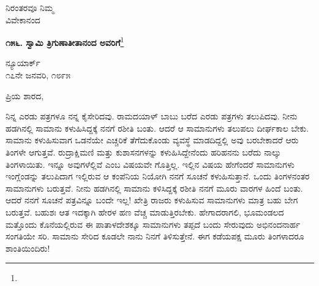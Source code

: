 {\flushright
ನಿರಂತರವೂ ನಿಮ್ಮ\\ವಿವೇಕಾನಂದ\par}

\begin{center}
\textbf{೧೫೬. ಸ್ವಾಮಿ ತ್ರಿಗುಣಾತೀತಾನಂದ ಅವರಿಗೆ}\footnote{}
\end{center}

\begin{flushright}
ನ್ಯೂಯಾರ್ಕ್\\೧೭ನೇ ಜನವರಿ, ೧೮೯೫
\end{flushright}

\noindent
ಪ್ರಿಯ ಶಾರದ,

ನಿನ್ನ ಎರಡು ಪತ್ರಗಳೂ ನನ್ನ ಕೈಸೇರಿದವು. ರಾಮದಯಾಳ್ ಬಾಬು ಬರೆದ ಎರಡು ಪತ್ರಗಳು ತಲುಪಿದವು. ನೀನು ಹಡಗಿನಲ್ಲಿ ಸಾಮಾನು ಕಳುಹಿಸಿದ್ದಕ್ಕೆ ನನಗೆ ರಶೀತಿ ಬಂತು. ಆದರೆ ಆ ಸಾಮಾನುಗಳು ತಲುಪಲು ದೀರ್ಘಕಾಲ ಬೇಕು. ಸಾಮಾನು ಕಳುಹಿಸುವಾಗ ಒಡನೆಯೇ ಎಚ್ಚರಿಕೆ ತೆಗೆದುಕೊಂಡು ವ್ಯವಸ್ಥೆ ಮಾಡದಿದ್ದಲ್ಲಿ ಅವು ಬರಬೇಕಾದರೆ ಆರು ತಿಂಗಳೇ ಆಗುತ್ತವೆ. ರುದ್ರಾಕ್ಷಿಮಣಿ ಮತ್ತು ಕುಶಾಸನಗಳನ್ನು ಕಳುಹಿಸಿದ್ದೇನೆಂದು ಹರಿಹನನು ಬರೆದು ನಾಲ್ಕು ತಿಂಗಳಾಯಿತು. ಇನ್ನೂ ಅವುಗಳೆಲ್ಲಿವೆ ಎಂಬ ವಿಷಯವೇ ಗೊತ್ತಿಲ್ಲ. ಇಲ್ಲಿನ ವಿಷಯ ಹೇಗೆಂದರೆ ಸಾಮಾನುಗಳು ಇಂಗ್ಲೆಂಡನ್ನು ತಲುಪಿದಾಗ ಇಲ್ಲಿರುವ ಆ ಕಂಪೆನಿಯ ನಿಯೋಗಿ ನನಗೆ ಸೂಚನೆ ಕಳುಹಿಸುತ್ತಾನೆ. ಒಂದು ತಿಂಗಳನಂತರ ಸಾಮಾನುಗಳು ಬರುತ್ತವೆ. ನೀನು ಹಡಗಿನಲ್ಲಿ ಸಾಮಾನು ಕಳಿಸಿದ್ದಕ್ಕೆ ರಶೀತಿ ನನಗೆ ಮೂರು ವಾರಗಳ ಹಿಂದೆ ಬಂತು. ಆದರೆ ನನಗೆ ಸೂಚನೆ ಪತ್ರವಿನ್ನೂ ಬಂದೇ ಇಲ್ಲ! ಖೇತ್ರಿ ರಾಜರು ಕಳುಹಿಸುವ ಸಾಮಾನುಗಳು ಮಾತ್ರ ಬಹು ಬೇಗ ಬರುತ್ತವೆ. ಬಹುಶಃ ಆತ ಇದಕ್ಕಾಗಿ ಹೇರಳ ಹಣ ವೆಚ್ಚ ಮಾಡುತ್ತಿರಬೇಕು. ಹೇಗಾದರಾಗಲಿ, ಭೂಮಂಡಲದ ಮತ್ತೊಂದು ಕೊನೆಯಲ್ಲಿರುವ ಈ ಪಾತಾಳದೇಶಕ್ಕೂ ಸಾಮಾನುಗಳು ತಪ್ಪದೆ ಬಂದು ಸೇರುವುದು ಅಭಿನಂದನಾರ್ಹ ಸಂಗತಿಯೇ ಸರಿ. ಸಾಮಾನು ಸೇರಿದ ಕೂಡಲೇ ನಾನು ನಿನಗೆ ತಿಳಿಸುತ್ತೇನೆ. ಈಗ ಕಡೆಯಪಕ್ಷ ಮೂರು ತಿಂಗಳಾದರೂ ಶಾಂತಿಯಿಂದಿರು!

